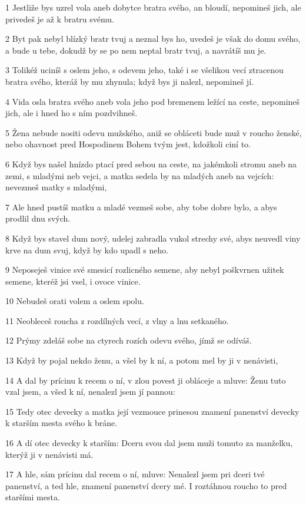 \par 1 Jestliže bys uzrel vola aneb dobytce bratra svého, an bloudí, nepomineš jich, ale privedeš je až k bratru svému.
\par 2 Byt pak nebyl blízký bratr tvuj a neznal bys ho, uvedeš je však do domu svého, a bude u tebe, dokudž by se po nem neptal bratr tvuj, a navrátíš mu je.
\par 3 Tolikéž uciníš s oslem jeho, s odevem jeho, také i se všelikou vecí ztracenou bratra svého, kteráž by mu zhynula; když bys ji nalezl, nepomineš jí.
\par 4 Vida osla bratra svého aneb vola jeho pod bremenem ležící na ceste, nepomineš jich, ale i hned ho s ním pozdvihneš.
\par 5 Žena nebude nositi odevu mužského, aniž se obláceti bude muž v roucho ženské, nebo ohavnost pred Hospodinem Bohem tvým jest, kdožkoli ciní to.
\par 6 Když bys našel hnízdo ptací pred sebou na ceste, na jakémkoli stromu aneb na zemi, s mladými neb vejci, a matka sedela by na mladých aneb na vejcích: nevezmeš matky s mladými,
\par 7 Ale hned pustíš matku a mladé vezmeš sobe, aby tobe dobre bylo, a abys prodlil dnu svých.
\par 8 Když bys stavel dum nový, udelej zabradla vukol strechy své, abys neuvedl viny krve na dum svuj, když by kdo upadl s neho.
\par 9 Neposeješ vinice své smesicí rozlicného semene, aby nebyl poškvrnen užitek semene, kteréž jsi vsel, i ovoce vinice.
\par 10 Nebudeš orati volem a oslem spolu.
\par 11 Neobleceš roucha z rozdílných vecí, z vlny a lnu setkaného.
\par 12 Prýmy zdeláš sobe na ctyrech rozích odevu svého, jímž se odíváš.
\par 13 Když by pojal nekdo ženu, a všel by k ní, a potom mel by ji v nenávisti,
\par 14 A dal by prícinu k recem o ní, v zlou povest ji obláceje a mluve: Ženu tuto vzal jsem, a všed k ní, nenalezl jsem jí pannou:
\par 15 Tedy otec devecky a matka její vezmouce prinesou znamení panenství devecky k starším mesta svého k bráne.
\par 16 A dí otec devecky k starším: Dceru svou dal jsem muži tomuto za manželku, kterýž ji v nenávisti má.
\par 17 A hle, sám prícinu dal recem o ní, mluve: Nenalezl jsem pri dceri tvé panenství, a ted hle, znamení panenství dcery mé. I roztáhnou roucho to pred staršími mesta.
